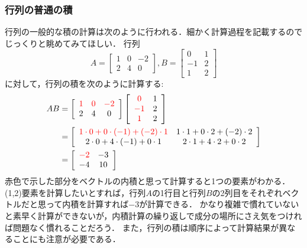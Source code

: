 \documentclass[a4paper,12pt,autodetect-engine,dvipdfmx]{jsarticle}
\theoremstyle{definition}
\begin{document}
\subsubsection{行列の普通の積}
行列の一般的な積の計算は次のように行われる．細かく計算過程を記載するのでじっくりと眺めてみてほしい．
行列
\begin{equation*}
    A = \begin{bmatrix}
        1 & 0 & -2 \\
        2 & 4 & 0 
    \end{bmatrix},
    B = \begin{bmatrix}
        0 & 1  \\
        -1 & 2  \\
        1 & 2 
    \end{bmatrix}
\end{equation*}
に対して，行列の積を次のように計算する:
\begin{align*}
    AB &= \left[\begin{array}{ccc}
        \textcolor{red}{1} & \textcolor{red}{0} & \textcolor{red}{-2} \\
        2 & 4 & 0 
    \end{array}
    \right]
    \left[\begin{array}{cc}
        \textcolor{red}{0} & 1  \\
        \textcolor{red}{-1} & 2  \\
        \textcolor{red}{1} & 2 
    \end{array}
    \right]\\
    &=\left[\begin{array}{cc}
        \textcolor{red}{1 \cdot 0 + 0 \cdot (-1) + (-2) \cdot 1} & 1\cdot 1 + 0\cdot 2 + (-2)\cdot 2\\
        2\cdot 0 + 4\cdot (-1) + 0\cdot 1 & 2\cdot1 + 4\cdot2 + 0\cdot2
    \end{array}
    \right]\\
    &=\left[
        \begin{array}{cc}
            \textcolor{red}{-2} & -3 \\
            -4 & 10
        \end{array}
    \right]
\end{align*}
赤色で示した部分をベクトルの内積と思って計算すると1つの要素がわかる．(1,2)要素を計算したいとすれば，行列$A$の1行目と行列$B$の2列目をそれぞれベクトルだと思って内積を計算すれば$-3$が計算できる．
かなり複雑で慣れていないと素早く計算ができないが，内積計算の繰り返しで成分の場所にさえ気をつければ問題なく慣れることだろう．
また，行列の積は順序によって計算結果が異なることにも注意が必要である．
\end{document}
